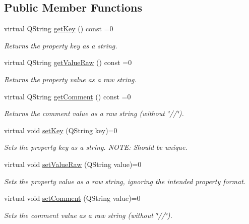 \subsection*{Public Member Functions}
\begin{DoxyCompactItemize}
\item 
virtual Q\-String \hyperlink{class_i_base_property_acbec936e956aa7fe59737af25e8b1962}{get\-Key} () const =0
\begin{DoxyCompactList}\small\item\em Returns the property key as a string. \end{DoxyCompactList}\item 
virtual Q\-String \hyperlink{class_i_base_property_adf7edb55057975980bac6b6fc5514d15}{get\-Value\-Raw} () const =0
\begin{DoxyCompactList}\small\item\em Returns the property value as a raw string. \end{DoxyCompactList}\item 
virtual Q\-String \hyperlink{class_i_base_property_a53f9fd81c8247dfce1ac651576dd4119}{get\-Comment} () const =0
\begin{DoxyCompactList}\small\item\em Returns the comment value as a raw string (without \char`\"{}//\char`\"{}). \end{DoxyCompactList}\item 
virtual void \hyperlink{class_i_base_property_ad30bd2bc99dee7717390adccb8156c9b}{set\-Key} (Q\-String key)=0
\begin{DoxyCompactList}\small\item\em Sets the property key as a string. N\-O\-T\-E\-: Should be unique. \end{DoxyCompactList}\item 
virtual void \hyperlink{class_i_base_property_a39895fa933cddf290aeab127ba9aaa94}{set\-Value\-Raw} (Q\-String value)=0
\begin{DoxyCompactList}\small\item\em Sets the property value as a raw string, ignoring the intended property format. \end{DoxyCompactList}\item 
virtual void \hyperlink{class_i_base_property_ac749532ada813980bcb0a2f74ec45460}{set\-Comment} (Q\-String value)=0
\begin{DoxyCompactList}\small\item\em Sets the comment value as a raw string (without \char`\"{}//\char`\"{}). \end{DoxyCompactList}\item 

\end{DoxyCompactItemize}
